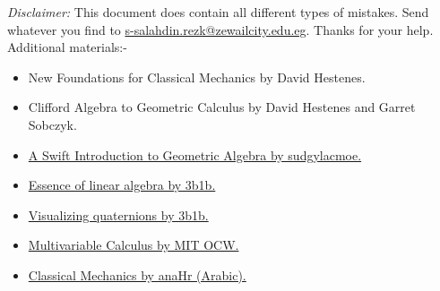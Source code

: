 \noindent \textit{Disclaimer:}
This document does contain all different types of mistakes.
Send whatever you find to
\href{mailto:s-salahdin.rezk@zewailcity.edu.eg}{s-salahdin.rezk@zewailcity.edu.eg}.
Thanks for your help.\\

Additional materials:-
\begin{itemize}
    \item New Foundations for Classical Mechanics by David Hestenes.
    \item Clifford Algebra to Geometric Calculus by David Hestenes and Garret Sobczyk.
    \item \href{https://www.youtube.com/watch?v=60z_hpEAtD8}{
A Swift Introduction to Geometric Algebra by sudgylacmoe.}
    \item \href{https://www.youtube.com/playlist?list=PLZHQObOWTQDPD3MizzM2xVFitgF8hE_ab}{Essence of linear algebra by 3b1b.}
    \item \href{https://www.youtube.com/watch?v=d4EgbgTm0Bg}{Visualizing quaternions by 3b1b.}
    \item \href{https://ocw.mit.edu/courses/res-18-007-calculus-revisited-multivariable-calculus-fall-2011/}{Multivariable Calculus by MIT OCW.}
    \item \href{https://www.youtube.com/playlist?list=PL8pYI62gCNsXyl6qNmOBlYdVQy6RLNItO}{Classical Mechanics by anaHr (Arabic).}
\end{itemize}
